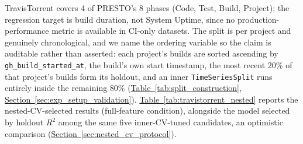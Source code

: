 \documentclass[technologies,article,submit,pdftex,moreauthors]{Definitions/mdpi}
\begin{document}
TravisTorrent covers 4 of PRESTO's 8 phases (Code, Test, Build, Project); the regression target is build duration, not System Uptime, since no production-performance metric is available in CI-only datasets. The split is per project and genuinely chronological, and we name the ordering variable so the claim is auditable rather than asserted: each project's builds are sorted ascending by \texttt{gh\_build\_started\_at}, the build's own start timestamp, the most recent 20\% of that project's builds form its holdout, and an inner \texttt{TimeSeriesSplit} runs entirely inside the remaining 80\% (\hyperref[tab:split_construction]{Table~\ref*{tab:split_construction}}, \hyperref[sec:exp_setup_validation]{Section~\ref*{sec:exp_setup_validation}}). \hyperref[tab:travistorrent_nested]{Table~\ref*{tab:travistorrent_nested}} reports the nested-CV-selected results (full-feature condition), alongside the model selected by holdout \(R^2\) among the same five inner-CV-tuned candidates, an optimistic comparison (\hyperref[sec:nested_cv_protocol]{Section~\ref*{sec:nested_cv_protocol}}).
\end{document}
